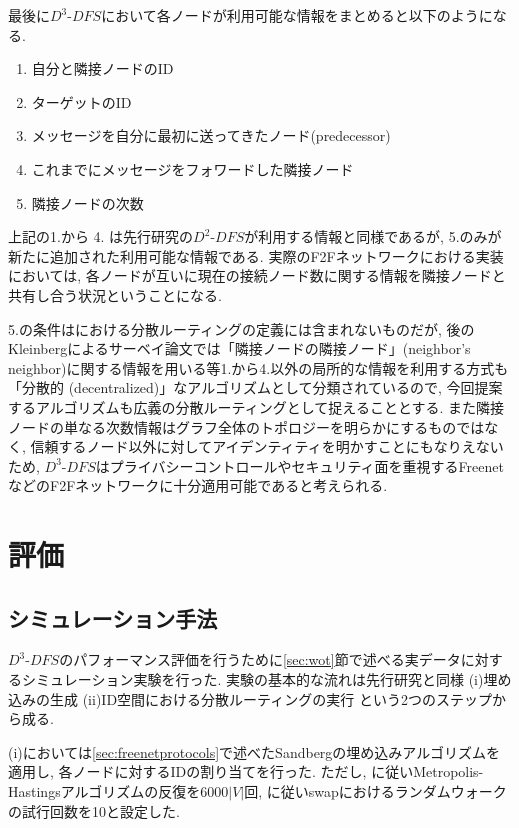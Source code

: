 \documentclass[dvipdfmx]{ampbt}
\begin{document}
最後に$D^3$-$DFS$において各ノードが利用可能な情報をまとめると以下のようになる.

\begin{enumerate}
 \item 自分と隣接ノードのID
 \item ターゲットのID
 \item メッセージを自分に最初に送ってきたノード(predecessor)
 \item これまでにメッセージをフォワードした隣接ノード
 \item 隣接ノードの次数
\end{enumerate}

上記の1.から 4. は先行研究の$D^2$-$DFS$が利用する情報と同様であるが, 5.のみが新たに追加された利用可能な情報である. 実際のF2Fネットワークにおける実装においては, 各ノードが互いに現在の接続ノード数に関する情報を隣接ノードと共有し合う状況ということになる.

5.の条件は\cite{kleinberg2000small}における分散ルーティングの定義には含まれないものだが, 後のKleinbergによるサーベイ論文\cite{kleinberg2006complex}では「隣接ノードの隣接ノード」(neighbor's neighbor)に関する情報を用いる\cite{manku2004know}等1.から4.以外の局所的な情報を利用する方式も「分散的 (decentralized)」なアルゴリズムとして分類されているので, 今回提案するアルゴリズムも広義の分散ルーティングとして捉えることとする. また隣接ノードの単なる次数情報はグラフ全体のトポロジーを明らかにするものではなく, 信頼するノード以外に対してアイデンティティを明かすことにもなりえないため, $D^3$-$DFS$はプライバシーコントロールやセキュリティ面を重視するFreenetなどのF2Fネットワークに十分適用可能であると考えられる.

 \section{評価}
  \subsection{シミュレーション手法}
  $D^3$-$DFS$のパフォーマンス評価を行うために\ref{sec:wot}節で述べる実データに対するシミュレーション実験を行った. 実験の基本的な流れは先行研究と同様 (i)埋め込みの生成 (ii)ID空間における分散ルーティングの実行 という2つのステップから成る.

  (i)においては\ref{sec:freenetprotocols}で述べたSandbergの埋め込みアルゴリズムを適用し, 各ノードに対するIDの割り当てを行った. ただし, \cite{sandberg2006distributed}に従いMetropolis-Hastingsアルゴリズムの反復を$6000|V|$回, \cite{roos2016analyzing}に従い\gls{swap}におけるランダムウォークの試行回数を10と設定した.
\end{document}
